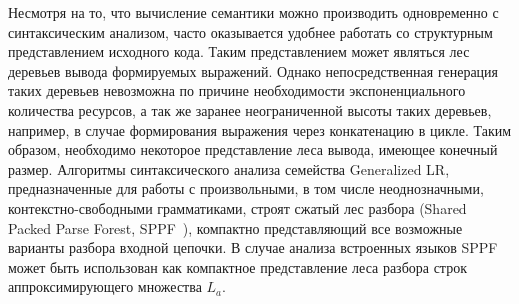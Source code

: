 Несмотря на то, что вычисление семантики можно производить одновременно с синтаксическим анализом, часто оказывается удобнее работать со структурным представлением исходного кода. Таким представлением может являться лес деревьев вывода формируемых выражений. Однако непосредственная генерация таких деревьев невозможна по причине необходимости экспоненциального количества ресурсов, а так же заранее неограниченной высоты таких деревьев, например, в случае формирования выражения через конкатенацию в цикле. Таким образом, необходимо некоторое  представление леса вывода, имеющее конечный размер. Алгоритмы синтаксического анализа семейства Generalized LR, предназначенные для работы с произвольными, в том числе неоднозначными, контекстно-свободными грамматиками, строят сжатый лес разбора (Shared Packed Parse Forest, SPPF~\cite{SPPF}), компактно представляющий все возможные варианты разбора входной цепочки. В случае анализа встроенных языков SPPF может быть использован как компактное представление леса разбора строк аппроксимирующего множества $L_{a}$. 